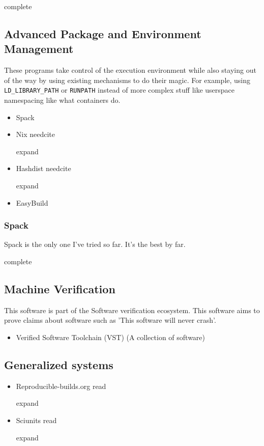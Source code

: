 \documentclass[american]{article}
\newcommand{\Read}{
	\gls{read}
}
\newcommand{\complete}{
	\gls{complete}
}
\newcommand{\needcite}{
	\gls{needcite}
}
\newcommand{\expand}{
	\gls{expand}
}
\begin{document}
\complete

\subsection{Advanced Package and Environment Management} \label{sec:software-advanced}

These programs take control of the execution environment while also staying out of the way by using existing mechanisms to do their magic. For example, using \texttt{LD\_LIBRARY\_PATH} or \texttt{RUNPATH} instead of more complex stuff like userspace namespacing like what containers do.

\begin{itemize}
\item Spack \cite{Spack}
\item Nix \needcite \expand
\item Hashdist \needcite \expand
\item EasyBuild \cite{EasyBuild}
\end{itemize}

\subsubsection{Spack} \label{sec:spack}

Spack \cite{Spack} is the only one I've tried so far. It's the best by far.

\complete

\subsection{Machine Verification} \label{sec:software-verification}

This software is part of the Software verification ecosystem. This software aims to prove claims about software such as 'This software will never crash'.

\begin{itemize}
\item Verified Software Toolchain (VST) (A collection of software) \cite{appel-program-logics-2014}
\end{itemize}

\subsection{Generalized systems} \label{sec:software-generalized}

\begin{itemize}
\item Reproducible-builds.org \cite{reproducible-builds} \Read \expand
\item Sciunits \cite{sciunits} \Read \expand
\end{itemize}
\end{document}
